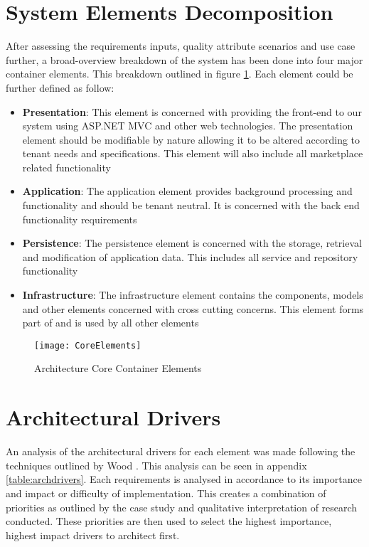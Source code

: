 \section{System Elements Decomposition}
After assessing the requirements inputs, quality attribute scenarios and use case further, a broad-overview breakdown of the system has been done into four major container elements. This breakdown outlined in figure \ref{fig:elements}. Each element could be further defined as follow:
\begin{itemize}
\item \textbf{Presentation}: This element is concerned with providing the front-end to our system using ASP.NET MVC and other web technologies. The presentation element should be modifiable by nature allowing it to be altered according to tenant needs and specifications. This element will also include all marketplace related functionality
\item \textbf{Application}: The application element provides background processing and functionality and should be tenant neutral. It is concerned with the back end functionality requirements
\item \textbf{Persistence}: The persistence element is concerned with the storage, retrieval and modification of application data. This includes all service and repository functionality
\item \textbf{Infrastructure}: The infrastructure element contains the components, models and other elements concerned with cross cutting concerns. This element forms part of and is used by all other elements
\end{itemize}

\begin{figure}
\centering
\texttt{[image: CoreElements]}
\caption{Architecture Core Container Elements}
\label{fig:elements}
\end{figure}


\section{Architectural Drivers}
An analysis of the architectural drivers for each element was made following the techniques outlined by Wood \cite{Wood2007}. This analysis can be seen in appendix \ref{table:archdrivers}. Each requirements is analysed in accordance to its importance and impact or difficulty of implementation. This creates a combination of priorities as outlined by the case study and qualitative interpretation of research conducted. These priorities are then used to select the highest importance, highest impact drivers to architect first. 



